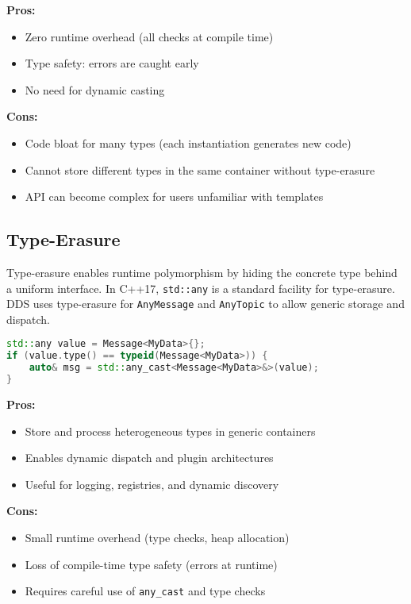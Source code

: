 \documentclass[12pt]{report}
\begin{document}
\textbf{Pros:}
\begin{itemize}
    \item Zero runtime overhead (all checks at compile time)
    \item Type safety: errors are caught early
    \item No need for dynamic casting
\end{itemize}
\textbf{Cons:}
\begin{itemize}
    \item Code bloat for many types (each instantiation generates new code)
    \item Cannot store different types in the same container without type-erasure
    \item API can become complex for users unfamiliar with templates
\end{itemize}

\subsection{Type-Erasure}
Type-erasure enables runtime polymorphism by hiding the concrete type behind a uniform interface. In C++17, \texttt{std::any} is a standard facility for type-erasure. DDS uses type-erasure for \texttt{AnyMessage} and \texttt{AnyTopic} to allow generic storage and dispatch.

\begin{lstlisting}[language=C++]
std::any value = Message<MyData>{};
if (value.type() == typeid(Message<MyData>)) {
    auto& msg = std::any_cast<Message<MyData>&>(value);
}
\end{lstlisting}

\textbf{Pros:}
\begin{itemize}
    \item Store and process heterogeneous types in generic containers
    \item Enables dynamic dispatch and plugin architectures
    \item Useful for logging, registries, and dynamic discovery
\end{itemize}
\textbf{Cons:}
\begin{itemize}
    \item Small runtime overhead (type checks, heap allocation)
    \item Loss of compile-time type safety (errors at runtime)
    \item Requires careful use of \texttt{any\_cast} and type checks
\end{itemize}
\end{document}

